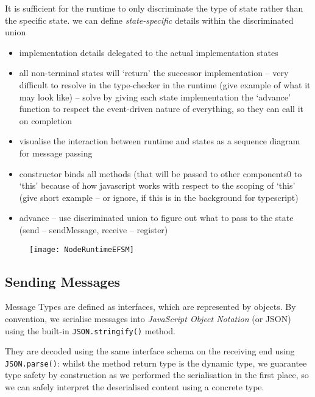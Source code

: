It is sufficient for the runtime to only discriminate the type of state
rather than the specific state. 
we can define \textit{state-specific}
details within the discriminated union


\begin{itemize}
\item implementation details delegated to the actual implementation states
\item all non-terminal states will `return' the successor implementation -- very difficult to resolve in the type-checker in the runtime (give example of what it may look like) -- solve by giving each state implementation the `advance' function to respect the event-driven nature of everything, so they can call it on completion
\item visualise the interaction between runtime and states as a sequence diagram for message passing
\item constructor binds all methods (that will be passed to other components0 to `this' because of how javascript works with respect to the scoping of `this' (give short example -- or ignore, if this is in the background for typescript)
\item advance -- use discriminated union to figure out what to pass to the state (send -- sendMessage, receive -- register)
\end{itemize}

\begin{figure}[!ht]
\centering
\texttt{[image: NodeRuntimeEFSM]}
\label{fig:noderuntimeefsm}
\end{figure}

\subsection{Sending Messages}
Message Types are defined as interfaces, which
are represented by objects. By convention,
we serialise messages into \textit{JavaScript Object Notation}
(or JSON) \cite{json} using the built-in \texttt{JSON.stringify()}
method.

They are decoded using the same interface schema on the receiving end
using \texttt{JSON.parse()}: whilst the method return type is the
dynamic  type, 
we guarantee type safety by construction
as we performed the serialisation in the first place, so
we can safely interpret the deserialised content 
using a concrete type.

